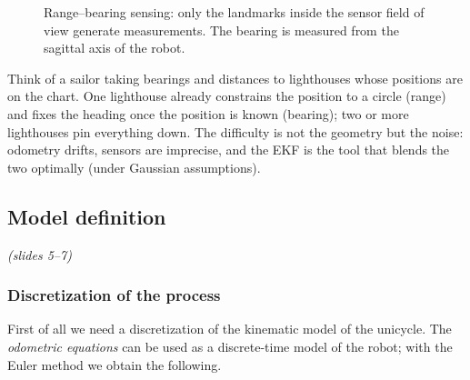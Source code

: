 \documentclass[11pt,a4paper]{article}
\theoremstyle{definition}
\theoremstyle{plain}
\theoremstyle{remark}
\newcommand{\slides}[1]{\par\vspace{-2pt}\noindent\emph{(slides #1)}\par\smallskip}
\newcommand{\robot}[3][fill=white]{\begin{scope}[shift={(#2)},rotate=#3]\draw[#1,thick] (0.24,0)--(-0.16,0.15)--(-0.16,-0.15)--cycle;\end{scope}}
\begin{document}
\begin{figure}[H]
\centering
{}
\caption{Range--bearing sensing: only the landmarks inside the sensor field of view generate measurements. The bearing is measured from the sagittal axis of the robot.}
\label{fig:fov}
\end{figure}

\begin{intuition}
Think of a sailor taking bearings and distances to lighthouses whose positions are on the chart. One lighthouse already constrains the position to a circle (range) and fixes the heading once the position is known (bearing); two or more lighthouses pin everything down. The difficulty is not the geometry but the noise: odometry drifts, sensors are imprecise, and the EKF is the tool that blends the two optimally (under Gaussian assumptions).
\end{intuition}

\subsection{Model definition}
\slides{5--7}

\subsubsection*{Discretization of the process}
First of all we need a discretization of the kinematic model of the unicycle. The \emph{odometric equations} can be used as a discrete-time model of the robot; with the Euler method we obtain the following.
\end{document}
